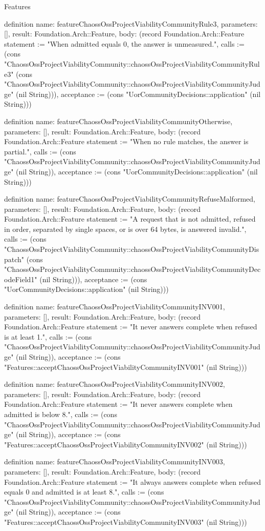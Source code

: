 \begin{lexlean}{Features}
\begin{semanticmodule}
definition{
  name: featureChaossOssProjectViabilityCommunityRule3,
  parameters: [],
  result: Foundation.Arch::Feature,
  body: (record Foundation.Arch::Feature {statement := "When admitted equals 0, the answer is unmeasured.", calls := (cons "ChaossOssProjectViabilityCommunity::chaossOssProjectViabilityCommunityRule3" (cons "ChaossOssProjectViabilityCommunity::chaossOssProjectViabilityCommunityJudge" (nil String))), acceptance := (cons "UorCommunityDecisions::application" (nil String))})
}

definition{
  name: featureChaossOssProjectViabilityCommunityOtherwise,
  parameters: [],
  result: Foundation.Arch::Feature,
  body: (record Foundation.Arch::Feature {statement := "When no rule matches, the answer is partial.", calls := (cons "ChaossOssProjectViabilityCommunity::chaossOssProjectViabilityCommunityJudge" (nil String)), acceptance := (cons "UorCommunityDecisions::application" (nil String))})
}

definition{
  name: featureChaossOssProjectViabilityCommunityRefuseMalformed,
  parameters: [],
  result: Foundation.Arch::Feature,
  body: (record Foundation.Arch::Feature {statement := "A request that is not admitted, refused in order, separated by single spaces, or is over 64 bytes, is answered invalid.", calls := (cons "ChaossOssProjectViabilityCommunity::chaossOssProjectViabilityCommunityDispatch" (cons "ChaossOssProjectViabilityCommunity::chaossOssProjectViabilityCommunityDecodeField1" (nil String))), acceptance := (cons "UorCommunityDecisions::application" (nil String))})
}

definition{
  name: featureChaossOssProjectViabilityCommunityINV001,
  parameters: [],
  result: Foundation.Arch::Feature,
  body: (record Foundation.Arch::Feature {statement := "It never answers complete when refused is at least 1.", calls := (cons "ChaossOssProjectViabilityCommunity::chaossOssProjectViabilityCommunityJudge" (nil String)), acceptance := (cons "Features::acceptChaossOssProjectViabilityCommunityINV001" (nil String))})
}

definition{
  name: featureChaossOssProjectViabilityCommunityINV002,
  parameters: [],
  result: Foundation.Arch::Feature,
  body: (record Foundation.Arch::Feature {statement := "It never answers complete when admitted is below 8.", calls := (cons "ChaossOssProjectViabilityCommunity::chaossOssProjectViabilityCommunityJudge" (nil String)), acceptance := (cons "Features::acceptChaossOssProjectViabilityCommunityINV002" (nil String))})
}

definition{
  name: featureChaossOssProjectViabilityCommunityINV003,
  parameters: [],
  result: Foundation.Arch::Feature,
  body: (record Foundation.Arch::Feature {statement := "It always answers complete when refused equals 0 and admitted is at least 8.", calls := (cons "ChaossOssProjectViabilityCommunity::chaossOssProjectViabilityCommunityJudge" (nil String)), acceptance := (cons "Features::acceptChaossOssProjectViabilityCommunityINV003" (nil String))})
}


\end{semanticmodule}
\end{lexlean}
